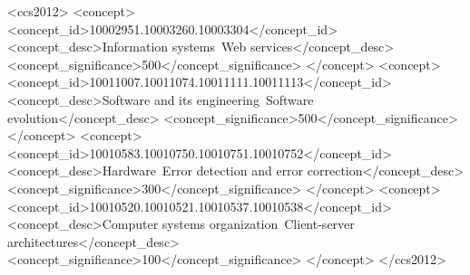 \begin{CCSXML}
<ccs2012>
<concept>
<concept_id>10002951.10003260.10003304</concept_id>
<concept_desc>Information systems~Web services</concept_desc>
<concept_significance>500</concept_significance>
</concept>
<concept>
<concept_id>10011007.10011074.10011111.10011113</concept_id>
<concept_desc>Software and its engineering~Software evolution</concept_desc>
<concept_significance>500</concept_significance>
</concept>
<concept>
<concept_id>10010583.10010750.10010751.10010752</concept_id>
<concept_desc>Hardware~Error detection and error correction</concept_desc>
<concept_significance>300</concept_significance>
</concept>
<concept>
<concept_id>10010520.10010521.10010537.10010538</concept_id>
<concept_desc>Computer systems organization~Client-server architectures</concept_desc>
<concept_significance>100</concept_significance>
</concept>
</ccs2012>
\end{CCSXML}


\maketitle